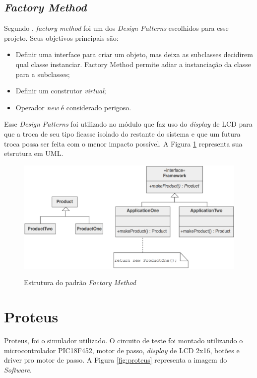 \subsection{\emph{Factory Method}}
Segundo \cite{shalloway2004design}, \emph{factory method} foi um dos \emph{Design Patterns} escolhidos para esse projeto. Seus objetivos principais são:

\begin{itemize}
\item Definir uma interface para criar um objeto, mas deixa as subclasses decidirem qual classe instanciar. Factory Method permite adiar a instanciação da classe para a subclasses;
\item Definir um construtor \emph{virtual};
\item Operador \emph{new} é considerado perigoso.
\end{itemize}

Esse \emph{Design Patterns} foi utilizado no módulo que faz uso do \emph{display} de LCD para que a troca de seu tipo ficasse isolado do restante do sistema e que um futura troca possa ser feita com o menor impacto possível. A Figura \ref{fig:factorymethod} representa sua etsrutura em UML. \newpage

\begin{figure}[htp]
	\centering
	\includegraphics[scale=0.4]{images/Factory_Method.png}
	\caption{Estrutura do padrão \emph{Factory Method}}	
	\label{fig:factorymethod}
	\cite{shalloway2004design}
\end{figure}

\section{Proteus}

Proteus, foi o simulador utilizado. O circuito de teste foi montado utilizando o microcontrolador PIC18F452, motor de passo, \emph{display} de LCD 2x16, botões e driver pro motor de passo. A Figura \ref{fig:proteus} representa a imagem do \emph{Software}.


